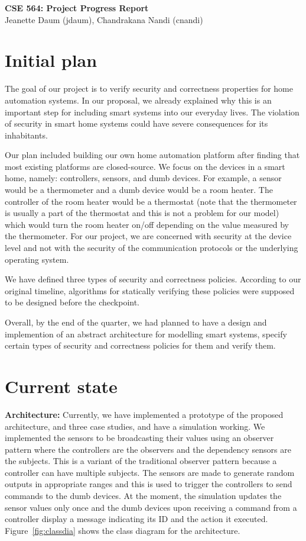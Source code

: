 \documentclass{article}
\begin{document}
\begin{center}
\large \textbf{CSE 564: Project Progress Report}\\
\normalsize {Jeanette Daum (jdaum), Chandrakana Nandi (cnandi) }
\end{center}
\section{Initial plan}
The goal of our project is to verify security and correctness properties for home automation systems. In our proposal, we already explained why this is an important step for including smart systems into our everyday lives. The violation of security in smart home systems could have severe consequences for its inhabitants. 

Our plan included building our own home automation platform after finding that most existing platforms are closed-source. We focus on the devices in a smart home, namely: controllers, sensors, and dumb devices. For example, a sensor would be a thermometer and a dumb device would be a room heater. The controller of the room heater would be a thermostat (note that the thermometer is usually a part of the thermostat and this is not a problem for our model) which would turn the room heater on/off depending on the value measured by the thermometer. For our project, we are concerned with security at the device level and not with the security of the communication protocols or the underlying operating system. 

We have defined three types of security and correctness policies. According to our original timeline, algorithms for statically verifying these policies were supposed to be designed before the checkpoint.

Overall, by the end of the quarter, we had planned to have a design and implemention of an abstract architecture for modelling smart systems, specify certain types of security and correctness policies for them and verify them. 

\section{Current state}
\textbf{Architecture:} Currently, we have implemented a prototype of the proposed architecture, and three case studies, and have a simulation working. We implemented the sensors to be broadcasting their values using an observer pattern where the controllers are the observers and the dependency sensors are the subjects. This is a variant of the traditional observer pattern because a controller can have multiple subjects. The sensors are made to generate random outputs in appropriate ranges and this is used to trigger the controllers to send commands to the dumb devices.  At the moment, the simulation updates the sensor values only once and the dumb devices upon receiving a command from a controller display a message indicating its ID and the action it executed. Figure~\ref{fig:classdia} shows the class diagram for the architecture. 
\end{document}
